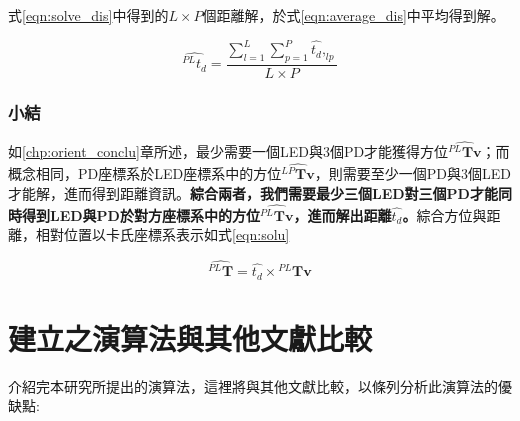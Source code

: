         \noindent 式\ref{eqn:solve_dis}中得到的$L\times P$個距離解，於式\ref{eqn:average_dis}中平均得到解。

        \begin{equation}
            \label{eqn:average_dis}
            \hat{^{PL}t_d }= \frac{\sum^{L}_{l=1}\sum^{P}_{p=1} \hat{t_d },_{lp} }{L\times P}
        \end{equation}

        \subsubsection{小結}

        如\ref{chp:orient_conclu}章所述，最少需要一個LED與3個PD才能獲得方位$\hat{{^{PL}\boldsymbol{Tv}}}$；而概念相同，PD座標系於LED座標系中的方位$\hat{{^{LP}\boldsymbol{Tv}}}$，則需要至少一個PD與3個LED才能解，進而得到距離資訊。\textbf{綜合兩者，我們需要最少三個LED對三個PD才能同時得到LED與PD於對方座標系中的方位$\hat{{^{PL}\boldsymbol{Tv}}}$，進而解出距離$\hat{t_d}$。}綜合方位與距離，相對位置以卡氏座標系表示如式\ref{eqn:solu}


        \begin{equation}
            \label{eqn:solu}
            \hat{^{PL}\boldsymbol{T} }= \hat{t_d} \times {^{PL}\boldsymbol{Tv}} 
        \end{equation}

\section{建立之演算法與其他文獻比較}
\label{chp:algorithm_ad_dis}


介紹完本研究所提出的演算法，這裡將與其他文獻比較，以條列分析此演算法的優缺點:


